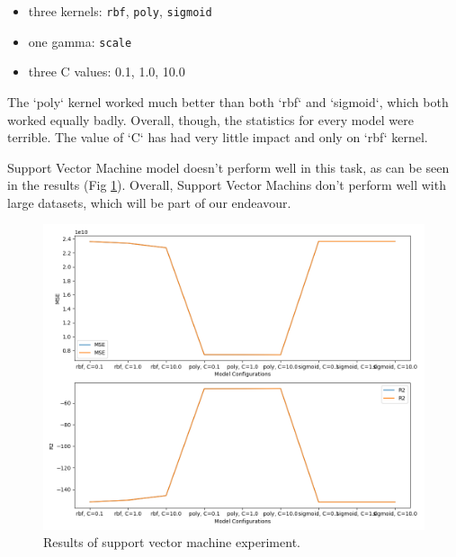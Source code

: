 \begin{itemize}
	\item three kernels: \verb|rbf|, \verb|poly|, \verb|sigmoid|
	\item one gamma: \verb|scale|
	\item three C values: 0.1, 1.0, 10.0
\end{itemize}
The `poly` kernel worked much better than both `rbf` and `sigmoid`, which both worked equally badly. Overall, though, the statistics for every model were terrible. The value of `C` has had very little impact and only on `rbf` kernel.

Support Vector Machine model doesn't perform well in this task, as can be seen in the results (Fig \ref{fig:svm}). Overall, Support Vector Machins don't perform well with large datasets, which will be part of our endeavour.

\begin{figure}[h!]
	\includegraphics[width=\linewidth]{"pictures/svm_models_results.png"}
	\caption{Results of support vector machine experiment.}
	\label{fig:svm}

\end{figure}



















